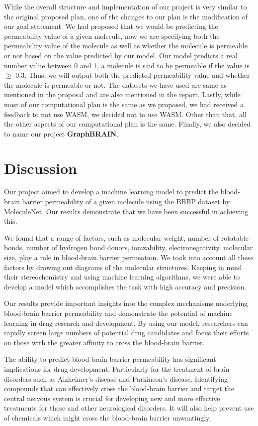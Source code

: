 \documentclass[fontsize=11pt]{article}
\begin{document}
While the overall structure and implementation of our project is very similar to the original proposed plan, one of the changes to our plan is the modification of our goal statement. We had proposed that we would be predicting the permeability value of a given molecule, now we are specifying both the permeability value of the molecule as well as whether the molecule is permeable or not based on the value predicted by our model. Our model predicts a real number value between 0 and 1, a molecule is said to be permeable if the value is $\geq$ 0.3. Thus, we will output both the predicted permeability value and whether the molecule is permeable or not. The datasets we have used are same as mentioned in the proposal and are also mentioned in the report. Lastly, while most of our computational plan is the same as we proposed, we had received a feedback to not use WASM, we decided not to use WASM. Other than that, all the other aspects of our computational plan is the same. Finally, we also decided to name our project \textbf{GraphBRAIN}.

\section*{Discussion}

Our project aimed to develop a machine learning model to predict the blood-brain barrier permeability of a given molecule using the BBBP dataset by MoleculeNet. Our results demonstrate that we have been successful in achieving this.

We found that a range of factors, such as molecular weight, number of rotatable bonds, number of hydrogen bond donors, ionizability, electronegativity, molecular size, play a role in blood-brain barrier permeation. We took into account all these factors by drawing out diagrams of the molecular structures. Keeping in mind their stereochemistry and using machine learning algorithms, we were able to develop a model which accomplishes the task with high accuracy and precision.

Our results provide important insights into the complex mechanisms underlying blood-brain barrier permeability and demonstrate the potential of machine learning in drug research and development. By using our model, researchers can rapidly screen large numbers of potential drug candidates and focus their efforts on those with the greater affinity to cross the blood-brain barrier.

The ability to predict blood-brain barrier permeability has significant implications for drug development. Particularly for the treatment of brain disorders such as Alzheimer's disease and Parkinson's disease. Identifying compounds that can effectively cross the blood-brain barrier and target the central nervous system is crucial for developing new and more effective treatments for these and other neurological disorders. It will also help prevent use of chemicals which might cross the blood-brain barrier unwantingly.
\end{document}

